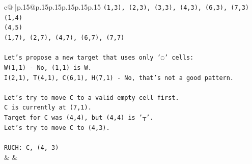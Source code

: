 \documentclass{article}
\begin{document}
{\begin{supertabular}{c@{$\;$}|p{.15\linewidth}@{}p{.15\linewidth}p{.15\linewidth}p{.15\linewidth}p{.15\linewidth}p{.15\linewidth}}
{{{\texttt{(1,3), (2,3), (3,3), (4,3), (6,3), (7,3)} \\
\texttt{(1,4)} \\
\texttt{(4,5)} \\
\texttt{(1,7), (2,7), (4,7), (6,7), (7,7)} \\
\\ 
\texttt{Let's propose a new target that uses only '◌' cells:} \\
\texttt{W(1,1) {-} No, (1,1) is W.} \\
\texttt{I(2,1), T(4,1), C(6,1), H(7,1) {-} No, that's not a good pattern.} \\
\\ 
\texttt{Let's try to move C to a valid empty cell first.} \\
\texttt{C is currently at (7,1).} \\
\texttt{Target for C was (4,4), but (4,4) is '┬'.} \\
\texttt{Let's try to move C to (4,3).} \\
\\ 
\texttt{RUCH: C, (4, 3)} \\
            }
        }
    }
    & & \\ \\


\end{supertabular}}
\end{document}
